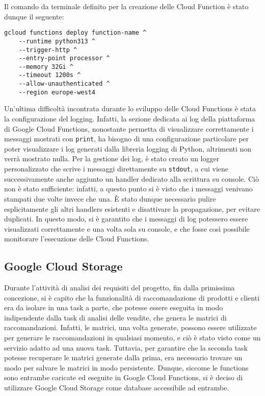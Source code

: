 Il comando da terminale definito per la creazione delle Cloud Function è stato dunque il seguente:
\begin{verbatim}
gcloud functions deploy function-name ^
    --runtime python313 ^
    --trigger-http ^
    --entry-point processor ^
    --memory 32Gi ^
    --timeout 1200s ^
    --allow-unauthenticated ^
    --region europe-west4
\end{verbatim}

Un'ultima difficoltà incontrata durante lo sviluppo delle Cloud Functions è stata la configurazione del logging. Infatti, la sezione dedicata ai log della piattaforma di Google Cloud Functions, nonostante permetta di visualizzare correttamente i messaggi mostrati con \texttt{print}, ha bisogno di una configurazione particolare per poter visualizzare i log generati dalla libreria \gls{logging} di Python, altrimenti non verrà mostrato nulla. Per la gestione dei log, è stato creato un logger personalizzato che scrive i messaggi direttamente su \texttt{stdout}, a cui viene successivamente anche aggiunto un handler dedicato alla scrittura su console. 
Ciò non è stato sufficiente: infatti, a questo punto si è visto che i messaggi venivano stampati due volte invece che una. È stato dunque necessario pulire esplicitamente gli altri handlers esistenti e disattivare la propagazione, per evitare duplicati. In questo modo, si è garantito che i messaggi di log potessero essere visualizzati correttamente e una volta sola su console, e che fosse così possibile monitorare l'esecuzione delle Cloud Functions.

\subsection{Google Cloud Storage}

Durante l'attività di analisi dei requisiti del progetto, fin dalla primissima concezione, si è capito che la funzionalità di raccomandazione di prodotti e clienti era da isolare in una task a parte, che potesse essere eseguita in modo indipendente dalla task di analisi delle vendite, che genera le matrici di raccomandazioni. Infatti, le matrici, una volta generate, possono essere utilizzate per generare le raccomandazioni in qualsiasi momento, e ciò è stato visto come un servizio adatto ad una nuova task. Tuttavia, per garantire che la seconda task potesse recuperare le matrici generate dalla prima, era necessario trovare un modo per salvare le matrici in modo persistente. Dunque, siccome le functions sono entrambe caricate ed eseguite in Google Cloud Functions, si è deciso di utilizzare Google Cloud Storage come database accessibile ad entrambe.

